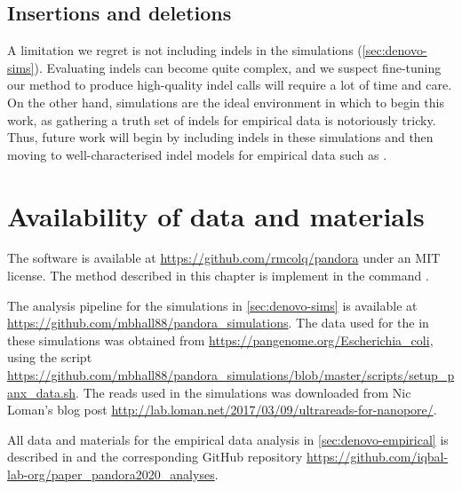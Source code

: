 \subsection{Insertions and deletions}

A limitation we regret is not including indels in the simulations (\autoref{sec:denovo-sims}). Evaluating indels can become quite complex, and we suspect fine-tuning our method to produce high-quality indel calls will require a lot of time and care. On the other hand, simulations are the ideal environment in which to begin this work, as gathering a truth set of indels for empirical data is notoriously tricky. Thus, future work will begin by including indels in these simulations and then moving to well-characterised indel models for empirical data such as \cite{Bush2021}.

\section{Availability of data and materials}

The \pandora{} software is available at \url{https://github.com/rmcolq/pandora} under an MIT license. The \denovo{} method described in this chapter is implement in the command \pandora{} .

The analysis pipeline for the simulations in \autoref{sec:denovo-sims} is available at \url{https://github.com/mbhall88/pandora_simulations}. The data used for the \panrg{} in these simulations was obtained from \url{https://pangenome.org/Escherichia_coli}, using the script \url{https://github.com/mbhall88/pandora_simulations/blob/master/scripts/setup_panx_data.sh}. The \ont{} reads used in the simulations was downloaded from Nic Loman's blog post \url{http://lab.loman.net/2017/03/09/ultrareads-for-nanopore/}.

All data and materials for the empirical data analysis in \autoref{sec:denovo-empirical} is described in \cite{pandora} and the corresponding GitHub repository \url{https://github.com/iqbal-lab-org/paper_pandora2020_analyses}.